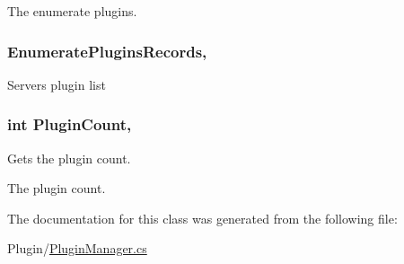 The enumerate plugins.\hypertarget{classOTA_1_1PluginManager_a1c871ff4915f084fb918eab859297e0a}{}
\subsubsection[{Enumerate\+Plugins\+Records}]{ Enumerate\+Plugins\+Records\hspace{0.3cm}{\ttfamily [static]}, {\ttfamily [get]}}\label{classOTA_1_1PluginManager_a1c871ff4915f084fb918eab859297e0a}


Server\textquotesingle{}s plugin list 

\hypertarget{classOTA_1_1PluginManager_a676977726f3e4e7364b93bb3b278a027}{}
\subsubsection[{Plugin\+Count}]{\setlength{\rightskip}{0pt plus 5cm}int Plugin\+Count\hspace{0.3cm}{\ttfamily [static]}, {\ttfamily [get]}}\label{classOTA_1_1PluginManager_a676977726f3e4e7364b93bb3b278a027}


Gets the plugin count. 

The plugin count.

The documentation for this class was generated from the following file\+:\begin{DoxyCompactItemize}
\item 
Plugin/\hyperlink{PluginManager_8cs}{Plugin\+Manager.\+cs}\end{DoxyCompactItemize}
